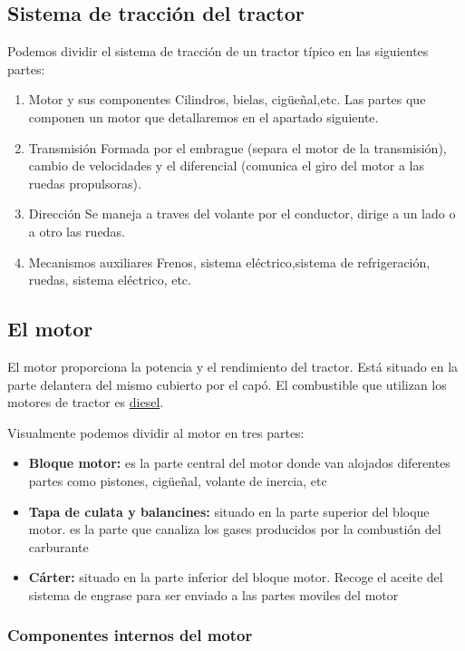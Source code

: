 \documentclass[a4paper,12pt,oneside]{article}
\begin{document}
\subsection{Sistema de tracción del tractor}
\label{sec:org4030e63}

Podemos dividir el sistema de tracción de un tractor típico en las siguientes
partes:
\begin{enumerate}
\item Motor y sus componentes
\label{sec:orgb375b0f}
Cilindros, bielas, cigüeñal,etc. Las partes que componen un motor que
detallaremos en el apartado siguiente.

\item Transmisión
\label{sec:org6a4025c}
Formada por el embrague (separa el motor de la transmisión), cambio de
velocidades y el diferencial (comunica el giro del motor a las ruedas
propulsoras).
\item Dirección
\label{sec:orgdee16c6}
Se maneja a traves del volante por el conductor, dirige a un lado o a otro las
ruedas.
\item Mecanismos auxiliares
\label{sec:orga74b2dd}
Frenos, sistema eléctrico,sistema de refrigeración, ruedas, sistema eléctrico,
etc.
\end{enumerate}

\subsection{El motor}
\label{sec:org4b2908d}

El motor proporciona la potencia y el rendimiento del tractor.  Está situado en 
la parte delantera del mismo cubierto por el capó. El combustible que utilizan
los motores de tractor es \uline{diesel}.

Visualmente podemos dividir al motor en tres partes:
\begin{itemize}
\item \textbf{Bloque motor:} es la parte central del motor donde van alojados diferentes
partes como pistones, cigüeñal, volante de inercia, etc
\item \textbf{Tapa de culata y balancines:} situado en la parte superior del bloque
motor. es la parte que canaliza los gases producidos por la combustión del carburante
\item \textbf{Cárter:} situado en la parte inferior del bloque motor. Recoge el aceite del
sistema de engrase para ser enviado a las partes moviles del motor
\end{itemize}
\subsubsection{Componentes internos del motor}
\label{sec:orgdaf6ab3}
\end{document}
